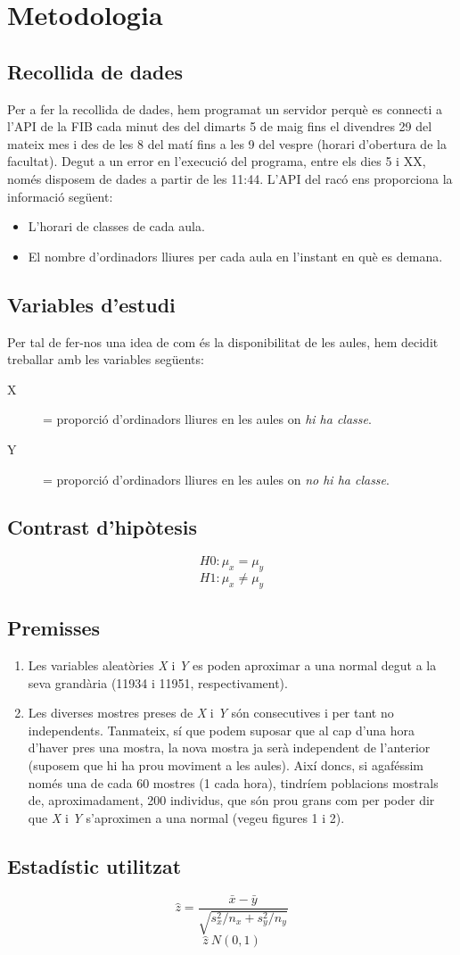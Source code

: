 \section{Metodologia}

\subsection{Recollida de dades}
Per a fer la recollida de dades, hem programat un servidor perquè es connecti a l'API de la FIB cada minut des del dimarts 5 de maig fins el divendres 29 del mateix mes i des de les 8 del matí fins a les 9 del vespre (horari d'obertura de la facultat). Degut a un error en l'execució del programa, entre els dies 5 i XX, només disposem de dades a partir de les  11:44.
L'API del racó ens proporciona la informació següent:
\begin{itemize}
	\item L'horari de classes de cada aula.
	\item El nombre d'ordinadors lliures per cada aula en l'instant en què es demana.
\end{itemize}

\subsection{Variables d'estudi}
Per tal de fer-nos una idea de com és la disponibilitat de les aules, hem decidit treballar amb les variables següents:
\begin{description}
	\item[X] = proporció d'ordinadors lliures en les aules on \emph{hi ha classe}.
	\item[Y] = proporció d'ordinadors lliures en les aules on \emph{no hi ha classe}.
\end{description}

\subsection{Contrast d'hipòtesis}
$$H0: \mu_x = \mu_y$$
$$H1: \mu_x \neq \mu_y$$

\subsection{Premisses}
\begin{enumerate}
	\item Les variables aleatòries \emph{X} i \emph{Y} es poden aproximar a una normal degut a la seva grandària (11934 i 11951, respectivament).
	\item Les diverses mostres preses de \emph{X} i \emph{Y} són consecutives i per tant no independents. Tanmateix, sí que podem suposar que al cap d'una hora d'haver pres una mostra, la nova mostra ja serà independent de l'anterior (suposem que hi ha prou moviment a les aules). Així doncs, si agaféssim només una de cada 60 mostres (1 cada hora), tindríem poblacions mostrals de, aproximadament, 200 individus, que són prou grans com per poder dir que \emph{X} i \emph{Y} s'aproximen a una normal (vegeu figures 1 i 2).
\end{enumerate}

\subsection{Estadístic utilitzat}
$$\hat{z} = \frac{\bar{x} - \bar{y}}{\sqrt{s_x^2/n_x + s_y^2/n_y}} $$
$$\hat{z} ~ N(0,1)$$


